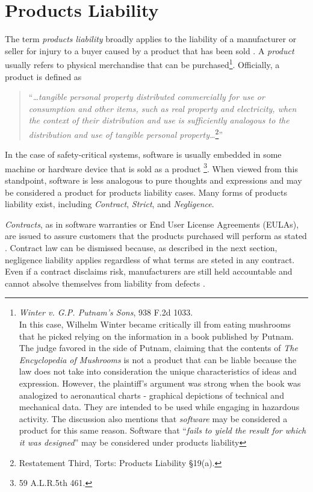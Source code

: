 \section{Products Liability}\label{S:Liability}
The term \textit{products liability} broadly applies to the liability of a
manufacturer or seller for injury to a buyer caused by a product that has been
sold \cite{Testing2005}. A \textit{product} usually refers to physical 
merchandise that can be purchased\footnote{\textit{Winter v. G.P. Putnam's
Sons}, 938 F.2d 1033.\\In this case, Wilhelm Winter became critically ill
from eating mushrooms that he picked relying on the information in a book
published by Putnam. The judge favored in the side of Putnam, claiming that the
contents of \textit{The Encyclopedia of Mushrooms} is not a product that can be
liable because the law does not take into consideration the unique
characteristics of ideas and expression. However, the plaintiff's argument was
strong when the book was analogized to aeronautical charts - graphical
depictions of technical and mechanical data. They are intended to be used while
engaging in hazardous activity. The discussion also mentions that
\textit{software} may be considered a product for this same reason. Software
that ``\textit{fails to yield the result for which it was designed}'' may be
considered under products liability}. Officially, a product is defined as 
\begin{quote}
``\textit{\ldots tangible personal property distributed commercially for use or
consumption and other items, such as real property and electricity, when the
context of their distribution and use is sufficiently analogous to the
distribution and use of tangible personal property\ldots}\footnote{Restatement
Third, Torts: Products Liability \S 19(a).}''
\end{quote}
In the case of safety-critical systems, software is usually embedded in
some machine or hardware device \cite{Leveson95} that is sold as a product
\footnote{59 A.L.R.5th 461.}. When viewed from this standpoint, software is less
analogous to pure thoughts and expressions and may be considered a product for
products liability cases. Many forms of products liability exist, including
\textit{Contract}, \textit{Strict}, and \textit{Negligence}.

\textit{Contracts}, as in software warranties or End User License Agreements
(EULAs), are issued to assure customers that the products purchased will perform
as stated \cite{Armour93}. Contract law can be dismissed because, as described
in the next section, negligence liability applies regardless of what terms are
steted in any contract. Even if a contract disclaims risk, manufacturers are
still held accountable and cannot absolve themselves from liability from
defects \cite{Ryan03}.

